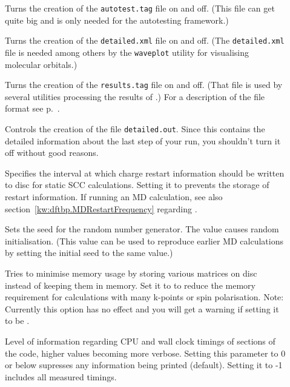 \begin{description}

\item[] Turns the creation of the
  \verb|autotest.tag| file on and off. (This file can get quite big
  and is only needed for the autotesting framework.)

\item[] Turns the creation of the
  \verb|detailed.xml| file on and off. (The \verb|detailed.xml| file
  is needed among others by the \verb|waveplot| utility for
  visualising molecular orbitals.)

\item[] Turns the creation of the \verb|results.tag| file on
  and off. (That file is used by several utilities processing the results of
  \dftbp.) For a description of the file format see
  p.~.

\item[] Controls the creation of the file
  \verb|detailed.out|. Since this contains the detailed information
  about the last step of your run, you shouldn't turn it off without
  good reasons.

\item[] Specifies the interval at which charge
  restart information should be written to disc for static SCC
  calculations. Setting it to  prevents the storage of restart
  information. If running an MD calculation, see also
  section~\ref{kw:dftbp.MDRestartFrequency} regarding .

\item[] Sets the seed for the random number
  generator. The value  causes random initialisation. (This
  value can be used to reproduce earlier MD calculations by setting
  the initial seed to the same value.)

\item[] Tries to minimise memory usage by
  storing various matrices on disc instead of keeping them in memory.
  Set it to  to reduce the memory requirement for calculations
  with many k-points or spin polarisation. Note: Currently this option has no
  effect and you will get a warning if setting it to be .

\item[] Level of information regarding CPU and wall clock
  timings of sections of the code, higher values becoming more verbose. Setting
  this parameter to 0 or below supresses any information being printed
  (default). Setting it to -1 includes all measured timings.


\end{description}
